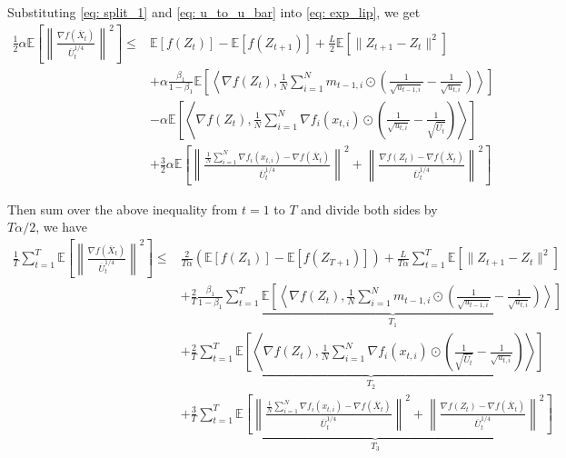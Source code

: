 \documentclass{article} %
\begin{document}
Substituting \eqref{eq: split_1} and \eqref{eq: u_to_u_bar} into \eqref{eq: exp_lip}, we get
\begin{align}\label{eq: exp_split}
\frac{1}{2} \alpha \mathbb E \left [\left\|\frac{\nabla f( \overline X_{t})}{\overline U_{t}^{1/4}}\right\|^2  \right]
\leq & \mathbb E  [f( Z_{t})]  -  \mathbb E [f( Z_{t+1})] + \frac{L}{2} \mathbb E\left[\| Z_{t+1}-  Z_{t}\|^2 \right] \nonumber  \\
&+ \alpha \frac{\beta_1}{1-\beta_1}  \mathbb E \left [\left \langle \nabla f( Z_{t}) , \frac{1}{N} \sum_{i=1}^N m_{t-1	,i} \odot (\frac{1}{\sqrt{u_{t-1,i}}} - \frac{1}{\sqrt{u_{t,i}}}) \right \rangle \right] \nonumber \\
& - \alpha \mathbb E \left [ \left \langle \nabla f( Z_{t}), \frac{1}{N} \sum_{i=1}^N \nabla f_i( x_{t,i})\odot \left(\frac{1}{\sqrt{u_{t,i}}} - \frac{1}{\sqrt{\overline U_{t}}}  \right)  \right \rangle \right] \nonumber \\
& + \frac{3}{2} \alpha \mathbb E \left [ \left\|  \frac{ \frac{1}{N}\sum_{i=1}^N \nabla f_i( x_{t,i}) -  \nabla f( \overline X_{t})}{\overline U_{t}^{1/4}}  \right\|^2 + \left\|\frac{\nabla f( Z_{t}) -\nabla f( \overline X_{t})}{\overline U_{t}^{1/4}}\right\|^2 \right]
\end{align}

Then sum over the above inequality from $t= 1$ to $T$ and divide both sides by $T\alpha/2$, we have
\begin{align}\label{eq: exp_telescope}
\frac{1}{T}\sum_{t=1}^T  \mathbb E \left [\left\|\frac{\nabla f( \overline X_{t})}{\overline U_{t}^{1/4}}\right\|^2  \right]
\leq & \frac{2}{T\alpha} ( \mathbb E  [f( Z_{1})]  -  \mathbb E [f( Z_{T+1})]) + \frac{L}{T\alpha} \sum_{t=1}^T\mathbb E\left[\| Z_{t+1}-  Z_{t}\|^2 \right] \nonumber  \\
&+ \frac{2}{T}\frac{\beta_1}{1-\beta_1} \underbrace{\sum_{t=1}^T   \mathbb E \left [\left \langle \nabla f( Z_{t}) , \frac{1}{N} \sum_{i=1}^N m_{t-1	,i} \odot (\frac{1}{\sqrt{u_{t-1,i}}} - \frac{1}{\sqrt{u_{t,i}}}) \right \rangle \right]}_{T_1} \nonumber \\
& + \frac{2}{T} \underbrace{\sum_{t=1}^T \mathbb E \left [ \left \langle \nabla f( Z_{t}), \frac{1}{N} \sum_{i=1}^N \nabla f_i( x_{t,i})\odot \left( \frac{1}{\sqrt{\overline U_{t}}} -\frac{1}{\sqrt{u_{t,i}}}  \right)  \right \rangle \right] }_{T_2}\nonumber \\
& + \frac{3}{T} \underbrace{\sum_{t=1}^T \mathbb E \left [ \left\|  \frac{ \frac{1}{N}\sum_{i=1}^N \nabla f_i( x_{t,i}) -  \nabla f( \overline X_{t})}{\overline U_{t}^{1/4}}  \right\|^2 + \left\|\frac{\nabla f( Z_{t}) -\nabla f( \overline X_{t})}{\overline U_{t}^{1/4}}\right\|^2 \right]}_{T_3}
\end{align}
\end{document}
